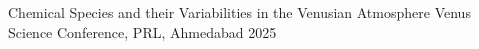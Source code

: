 
\begin{cvtalks}

    \cvtalk
    {Chemical Species and their Variabilities in the Venusian Atmosphere} %
    {Venus Science Conference, PRL, Ahmedabad} %
    {2025} %

\end{cvtalks}
